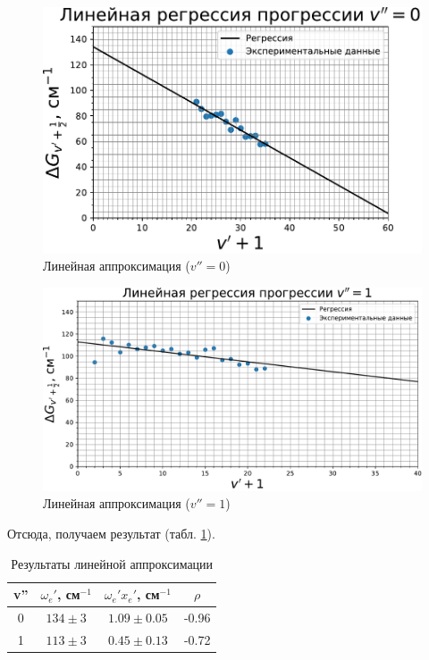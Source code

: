 \begin{figure}[h!]
	\centering
	\includegraphics[width=0.81\linewidth]{data/deltaG(v_0).pdf}
	\caption{Линейная аппроксимация ($v''=0$)}
	\label{deltaG0}
\end{figure}
\begin{figure}[h!]
	\centering
	\includegraphics[width=0.79\linewidth]{data/deltaG(v_1).pdf}
	\caption{Линейная аппроксимация ($v''=1$)}
	\label{deltaG1}
\end{figure}

Отсюда, получаем результат (табл. \ref{tab:linear_approx}).
\begin{table}[h!]
	\centering
	\caption{Результаты линейной аппроксимации}
	\begin{tabular}{|c|c|c|c|}
		\hline
		\multicolumn{1}{|l|}{v''} & \multicolumn{1}{l|}{$\omega_e'$, см$^{-1}$} & \multicolumn{1}{l|}{$\omega_e' x_e'$, см$^{-1}$} & \multicolumn{1}{c|}{$\rho$} \bigstrut\\
		\hline
		0 & $134\pm 3$ & $1.09\pm 0.05$& -0.96 \bigstrut\\
		\hline
		1 & $113\pm 3$& $0.45\pm 0.13$ & -0.72 \bigstrut\\
		\hline
	\end{tabular}%
	\label{tab:linear_approx}%
\end{table}%

